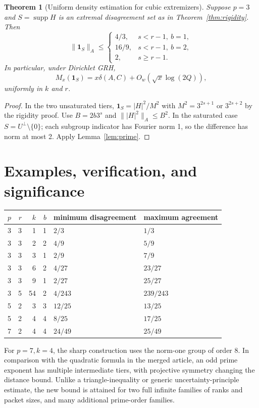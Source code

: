 \documentclass[11pt]{article}
\newtheorem{theorem}{Theorem}[section]
\theoremstyle{definition}\newtheorem{definition}[theorem]{Definition}
\theoremstyle{remark}\newtheorem{remark}[theorem]{Remark}
\newcommand{\supp}{\operatorname{supp}}
\begin{document}
\begin{theorem}[Uniform density estimation for cubic extremizers]\label{thm:density}
Suppose $p=3$ and $S=\supp H$ is an extremal disagreement set as in Theorem~\ref{thm:rigidity}. Then
\[
 \|\mathbf1_S\|_A\le\begin{cases}4/3,&s<r-1,\ b=1,\\16/9,&s<r-1,\ b=2,\\2,&s\ge r-1.\end{cases}
\]
In particular, under Dirichlet GRH,
\[M_x(\mathbf1_S)=x\delta(A,C)+O_w(\sqrt x\log(2Q)),\]
uniformly in $k$ and $r$.
\end{theorem}
\begin{proof}
In the two unsaturated tiers, $\mathbf1_S=|H|^2/M^2$ with $M^2=3^{2s+1}$ or $3^{2s+2}$ by the rigidity proof. Use $B=2b3^s$ and $\||H|^2\|_A\le B^2$. In the saturated case $S=U^\perp\setminus\{0\}$; each subgroup indicator has Fourier norm 1, so the difference has norm at most 2. Apply Lemma~\ref{lem:prime}.
\end{proof}

\section{Examples, verification, and significance}
\begin{center}
\begin{tabular}{@{}rrrrll@{}}
\toprule
$p$&$r$&$k$&$b$&minimum disagreement&maximum agreement\\
\midrule
3&3&1&1&$2/3$&$1/3$\\
3&3&2&2&$4/9$&$5/9$\\
3&3&3&1&$2/9$&$7/9$\\
3&3&6&2&$4/27$&$23/27$\\
3&3&9&1&$2/27$&$25/27$\\
3&5&54&2&$4/243$&$239/243$\\
5&2&3&3&$12/25$&$13/25$\\
5&2&4&4&$8/25$&$17/25$\\
7&2&4&4&$24/49$&$25/49$\\
\bottomrule
\end{tabular}
\end{center}
For $p=7,k=4$, the sharp construction uses the norm-one group of order 8. In comparison with the quadratic formula in the merged article, an odd prime exponent has multiple intermediate tiers, with projective symmetry changing the distance bound. Unlike a triangle-inequality or generic uncertainty-principle estimate, the new bound is attained for two full infinite families of ranks and packet sizes, and many additional prime-order families.
\end{document}
